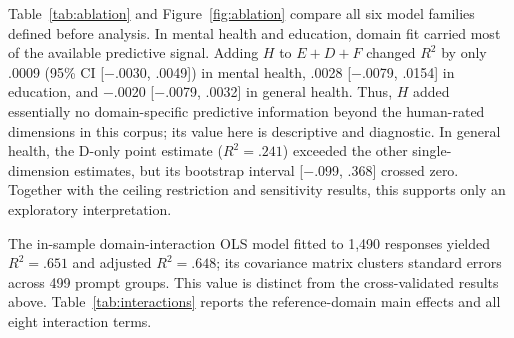 \documentclass[manuscript,review,anonymous]{acmart}
\begin{document}
Table~\ref{tab:ablation} and Figure~\ref{fig:ablation} compare all six model families defined before analysis. In mental health and education, domain fit carried most of the available predictive signal. Adding $H$ to $E+D+F$ changed $R^2$ by only .0009 (95\% CI [$-$.0030, .0049]) in mental health, .0028 [$-$.0079, .0154] in education, and $-$.0020 [$-$.0079, .0032] in general health. Thus, $H$ added essentially no domain-specific predictive information beyond the human-rated dimensions in this corpus; its value here is descriptive and diagnostic. In general health, the D-only point estimate ($R^2=.241$) exceeded the other single-dimension estimates, but its bootstrap interval [$-$.099, .368] crossed zero. Together with the ceiling restriction and sensitivity results, this supports only an exploratory interpretation.

The in-sample domain-interaction OLS model fitted to 1,490 responses yielded $R^2=.651$ and adjusted $R^2=.648$; its covariance matrix clusters standard errors across 499 prompt groups. This value is distinct from the cross-validated results above. Table~\ref{tab:interactions} reports the reference-domain main effects and all eight interaction terms.
\end{document}
